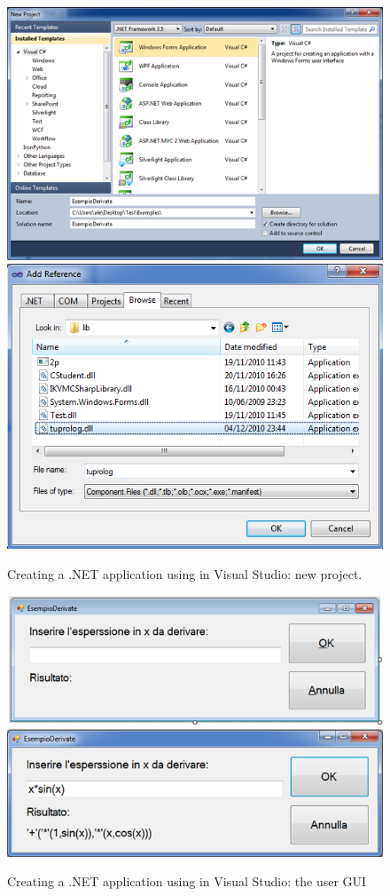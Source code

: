 \begin{figure}
  \includegraphics[width=12cm]{images/dotnet-visualstudio1}\\
  \includegraphics[width=12cm]{images/dotnet-visualstudio2}
  \caption{Creating a .NET application using \tuprolog{} in Visual Studio: new project.}\label{fig:dotnet-visualstudio1}
\end{figure}

\begin{figure}
  \includegraphics[width=12cm]{images/dotnet-visualstudio3}\\
  \includegraphics[width=12cm]{images/dotnet-visualstudio5}
  \caption{Creating a .NET application using \tuprolog{} in Visual Studio: the user GUI}\label{fig:dotnet-visualstudio3}
\end{figure}

